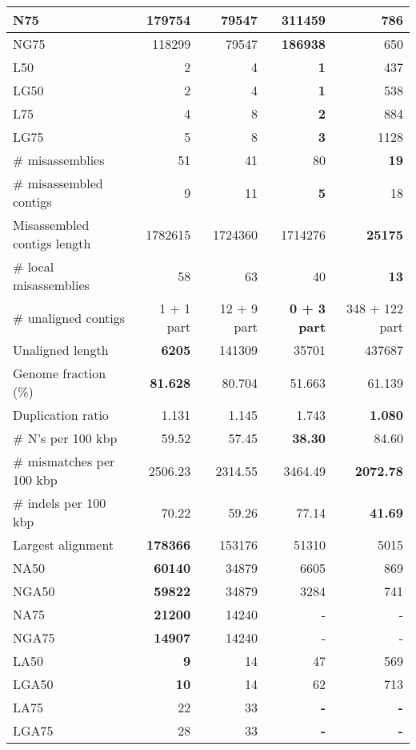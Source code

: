 \documentclass[12pt,a4paper]{article}
\begin{document}
\begin{table}[ht]
\begin{center}
\begin{tabular}{|l*{4}{|r}|}
N75 & 179754 & 79547 & {\bf 311459} & 786 \\ \hline
NG75 & 118299 & 79547 & {\bf 186938} & 650 \\ \hline
L50 & 2 & 4 & {\bf 1} & 437 \\ \hline
LG50 & 2 & 4 & {\bf 1} & 538 \\ \hline
L75 & 4 & 8 & {\bf 2} & 884 \\ \hline
LG75 & 5 & 8 & {\bf 3} & 1128 \\ \hline
\# misassemblies & 51 & 41 & 80 & {\bf 19} \\ \hline
\# misassembled contigs & 9 & 11 & {\bf 5} & 18 \\ \hline
Misassembled contigs length & 1782615 & 1724360 & 1714276 & {\bf 25175} \\ \hline
\# local misassemblies & 58 & 63 & 40 & {\bf 13} \\ \hline
\# unaligned contigs & 1 + 1 part & 12 + 9 part & {\bf 0 + 3 part} & 348 + 122 part \\ \hline
Unaligned length & {\bf 6205} & 141309 & 35701 & 437687 \\ \hline
Genome fraction (\%) & {\bf 81.628} & 80.704 & 51.663 & 61.139 \\ \hline
Duplication ratio & 1.131 & 1.145 & 1.743 & {\bf 1.080} \\ \hline
\# N's per 100 kbp & 59.52 & 57.45 & {\bf 38.30} & 84.60 \\ \hline
\# mismatches per 100 kbp & 2506.23 & 2314.55 & 3464.49 & {\bf 2072.78} \\ \hline
\# indels per 100 kbp & 70.22 & 59.26 & 77.14 & {\bf 41.69} \\ \hline
Largest alignment & {\bf 178366} & 153176 & 51310 & 5015 \\ \hline
NA50 & {\bf 60140} & 34879 & 6605 & 869 \\ \hline
NGA50 & {\bf 59822} & 34879 & 3284 & 741 \\ \hline
NA75 & {\bf 21200} & 14240 & - & - \\ \hline
NGA75 & {\bf 14907} & 14240 & - & - \\ \hline
LA50 & {\bf 9} & 14 & 47 & 569 \\ \hline
LGA50 & {\bf 10} & 14 & 62 & 713 \\ \hline
LA75 & 22 & 33 & {\bf -} & {\bf -} \\ \hline
LGA75 & 28 & 33 & {\bf -} & {\bf -} \\ \hline
\end{tabular}
\end{center}
\end{table}
\end{document}
